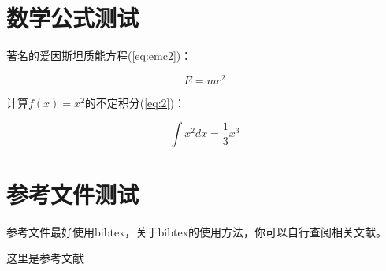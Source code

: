 \section{数学公式测试}

著名的爱因斯坦质能方程(\ref{eq:emc2})：

\begin{equation}
  \label{eq:emc2}
  E=mc^2
\end{equation}

计算$f(x)=x^2$的不定积分(\ref{eq:2})：

\begin{equation}
  \label{eq:2}
  \int x^2 dx = \frac{1}{3} x^3
\end{equation}
\section{参考文件测试}
参考文件最好使用bibtex，关于bibtex的使用方法，你可以自行查阅相关文献。

这里是参考文献\cite{c_minigui}

